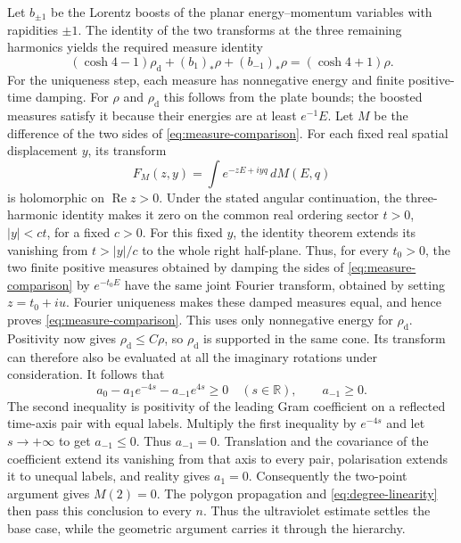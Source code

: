 \documentclass[11pt,letterpaper,reqno]{amsart}
\theoremstyle{definition}
\theoremstyle{remark}
\newcommand{\R}{\mathbb R}
\begin{document}
Let $b_{\pm1}$ be the Lorentz boosts of the planar energy--momentum
variables with rapidities $\pm1$. The identity of the two transforms
at the three remaining harmonics yields the required measure identity
\begin{equation}\label{eq:measure-comparison}
 (\cosh4-1)\rho_{\mathrm d}
 +(b_1)_*\rho+(b_{-1})_*\rho
 =(\cosh4+1)\rho.
\end{equation}
For the uniqueness step, each measure has nonnegative energy and
finite positive-time damping. For $\rho$ and $\rho_{\mathrm d}$ this
follows from the plate bounds; the boosted measures satisfy it
because their energies are at least $e^{-1}E$. Let $M$ be the
difference of the two sides of \eqref{eq:measure-comparison}. For
each fixed real spatial displacement $y$, its transform
\[
 F_M(z,y)=\int e^{-zE+iyq}\,dM(E,q)
\]
is holomorphic on $\operatorname{Re}z>0$. Under the stated angular
continuation, the three-harmonic identity makes it zero on the
common real ordering sector $t>0$, $|y|<ct$, for a fixed $c>0$.
For this fixed $y$, the identity theorem extends its vanishing
from $t>|y|/c$ to the whole right half-plane. Thus, for every
$t_0>0$, the two finite positive measures obtained by damping the
sides of \eqref{eq:measure-comparison} by $e^{-t_0E}$ have the same
joint Fourier transform, obtained by setting $z=t_0+iu$. Fourier
uniqueness \cite[Theorem, p.~1]{Grimmett2004} makes these damped
measures equal, and hence proves \eqref{eq:measure-comparison}.
This uses only nonnegative energy for $\rho_{\mathrm d}$.
Positivity now gives
$\rho_{\mathrm d}\le C\rho$, so $\rho_{\mathrm d}$ is supported
in the same cone. Its transform can therefore also be evaluated at
all the imaginary rotations under consideration. It follows that
\begin{equation}\label{eq:two-signs}
 a_0-a_1e^{-4s}-a_{-1}e^{4s}\ge0\quad(s\in\R),
 \qquad a_{-1}\ge0.
\end{equation}
The second inequality is positivity of the leading Gram coefficient
on a reflected time-axis pair with equal labels. Multiply the first
inequality by $e^{-4s}$ and let $s\to+\infty$ to get $a_{-1}\le0$.
Thus $a_{-1}=0$. Translation and the covariance of the coefficient
extend its vanishing from that axis to every pair, polarisation
extends it to unequal labels, and reality gives $a_1=0$.
Consequently the two-point argument gives $M(2)=0$. The polygon
propagation and \eqref{eq:degree-linearity} then pass this conclusion
to every $n$. Thus the ultraviolet estimate settles the base case,
while the geometric argument carries it through the hierarchy.
\end{document}
